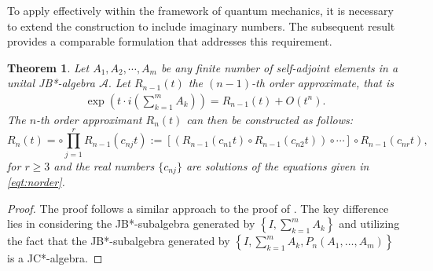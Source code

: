 \documentclass{article}
\theoremstyle{plain} %
\newtheorem{thm}{Theorem}[section]
\numberwithin{equation}{section}
\begin{document}
To apply  effectively within the framework of quantum mechanics, it is necessary to extend the construction to include imaginary numbers. The subsequent result provides a comparable formulation that addresses this requirement.
\begin{thm}\label{thm:Trotter:higher:unitary:JB*}
Let $A_1, A_2,\cdots, A_m$ be any finite number of self-adjoint elements in a unital JB*-algebra $\mathcal{A}.$ Let $R_{n-1}(t)$ the $(n-1)$-th order approximate, that is 
    \begin{align*}
       \exp\left(t\cdot i\left(\sum_{k=1}^m A_k \right)\right)=R_{n-1}(t)+O(t^n). 
    \end{align*}
The $n$-th order approximant $R_n(t)$ can then be constructed as follows:
\begin{equation}\label{eq: imaginary non-symmetric approximant}
 R_n(t)= \circ \prod_{j=1}^r R_{n-1}(c_{nj} t) :=\left[\left(R_{n-1}(c_{n1} t)\circ R_{n-1}(c_{n2} t)\right)\circ \cdots\right]\circ R_{n-1}(c_{nr} t),   
\end{equation}
for $r\geq 3$ and the real numbers $\{c_{nj}\}$ are solutions of the equations given in {\rm\cref{eqt:norder}}.

\end{thm}
\begin{proof}
The proof follows a similar approach to the proof of . 
The key difference lies in considering the JB*-subalgebra generated by $\displaystyle \left\{ I, \sum_{k=1}^m A_k \right\}$ and utilizing the fact that the JB*-subalgebra generated by $\displaystyle \left\{ I, \sum_{k=1}^m A_k, P_n(A_1, \dots, A_m) \right\}$ is a JC*-algebra.
\end{proof}
\fi 
\end{document}
